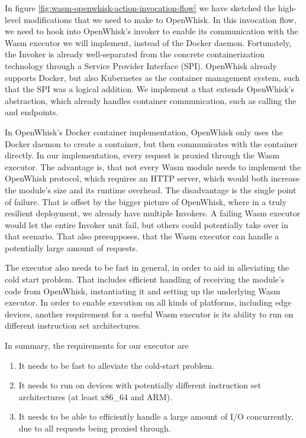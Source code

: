 In figure \ref{fig:wasm-openwhisk-action-invocation-flow} we have sketched the high-level modifications that we need to make to OpenWhisk. In this invocation flow, we need to hook into OpenWhisk's invoker to enable its communication with the Wasm executor we will implement, instead of the Docker daemon. Fortunately, the Invoker is already well-separated from the concrete containerization technology through a Service Provider Interface (SPI). OpenWhisk already supports Docker, but also Kubernetes as the container management system, such that the SPI was a logical addition. We implement a  that extends OpenWhisk's  abstraction, which already handles container communication, such as calling the  and  endpoints.


In OpenWhisk's Docker container implementation, OpenWhisk only uses the Docker daemon to create a container, but then communicates with the container directly. In our implementation, every request is proxied through the Wasm executor. The advantage is, that not every Wasm module needs to implement the OpenWhisk protocol, which requires an HTTP server, which would both increase the module's size and its runtime overhead. The disadvantage is the single point of failure. That is offset by the bigger picture of OpenWhisk, where in a truly resilient deployment, we already have multiple Invokers. A failing Wasm executor would let the entire Invoker unit fail, but others could potentially take over in that scenario. That also presupposes, that the Wasm executor can handle a potentially large amount of requests.


The executor also needs to be fast in general, in order to aid in alleviating the cold start problem. That includes efficient handling of receiving the module's code from OpenWhisk, instantiating it and setting up the underlying Wasm executor. In order to enable execution on all kinds of platforms, including edge devices, another requirement for a useful Wasm executor is its ability to run on different instruction set architectures.

In summary, the requirements for our executor are

\begin{enumerate}
    \item It needs to be fast to alleviate the cold-start problem.
    \item It needs to run on devices with potentially different instruction set architectures (at least x86\_64 and ARM).
    \item It needs to be able to efficiently handle a large amount of I/O concurrently, due to all requests being proxied through.
\end{enumerate}




